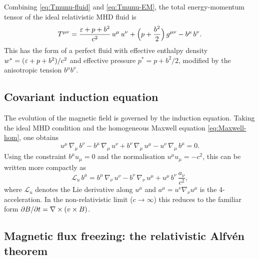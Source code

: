 Combining \eqref{eq:Tmunu-fluid} and \eqref{eq:Tmunu-EM}, the total
energy-momentum tensor of the ideal relativistic MHD fluid is
\begin{equation}
  T^{\mu\nu}
  = \frac{\varepsilon + p + b^{2}}{c^{2}}\,u^{\mu}\,u^{\nu}
  + \Bigl(p + \frac{b^{2}}{2}\Bigr)\,g^{\mu\nu}
  - b^{\mu}\,b^{\nu}.
  \label{eq:Tmunu-MHD}
\end{equation}
This has the form of a perfect fluid with effective enthalpy density
$w^{\ast} = (\varepsilon + p + b^{2})/c^{2}$ and effective
pressure $p^{\ast} = p + b^{2}/2$, modified by the anisotropic tension
$b^{\mu}b^{\nu}$.

\subsection{Covariant induction equation}

The evolution of the magnetic field is governed by the induction equation.
Taking the ideal MHD condition and the homogeneous Maxwell equation
\eqref{eq:Maxwell-hom}, one obtains
\begin{equation}
  u^{\mu}\,\nabla_{\mu}\,b^{\nu}
  - b^{\mu}\,\nabla_{\mu}\,u^{\nu}
  + b^{\nu}\,\nabla_{\mu}\,u^{\mu}
  - u^{\nu}\,\nabla_{\mu}\,b^{\mu}
  = 0.
  \label{eq:induction-covariant}
\end{equation}
Using the constraint $b^{\mu}u_{\mu}=0$ and the normalisation
$u^{\mu}u_{\mu}=-c^{2}$, this can be written more compactly as
\begin{equation}
  \mathcal{L}_{u}\,b^{\mu}
  = b^{\mu}\,\nabla_{\nu}\,u^{\nu}
    - b^{\nu}\,\nabla_{\nu}\,u^{\mu}
    + u^{\mu}\,b^{\nu}\,\frac{a_{\nu}}{c^{2}},
  \label{eq:induction-Lie}
\end{equation}
where $\mathcal{L}_{u}$ denotes the Lie derivative along $u^{\mu}$ and
$a^{\mu} = u^{\nu}\nabla_{\nu}u^{\mu}$ is the 4-acceleration.  In the
non-relativistic limit ($c\to\infty$) this reduces to the familiar form
$\partial B/\partial t = \nabla\times(v\times B)$.

\subsection{Magnetic flux freezing: the relativistic Alfv\'en theorem}

